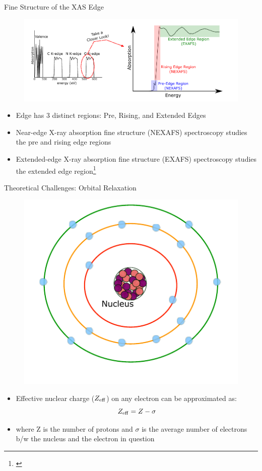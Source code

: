 \documentclass[t]{beamer}
\newcommand\footcite[1]{\footnote{\bibentry{#1}\label{\thepage:#1}}}
\begin{document}
\begin{frame}{Fine Structure of the XAS Edge}
\begin{figure}
\includegraphics[scale=0.7]{fine_structure.pdf}
\end{figure}
\begin{itemize}
\item Edge has 3 distinct regions: Pre, Rising, and Extended Edges
\item Near-edge X-ray absorption fine structure (NEXAFS) spectroscopy studies the pre and rising edge regions
\item Extended-edge X-ray absorption fine structure (EXAFS) spectroscopy studies the extended edge region\footcite{teo_exafs:_2012}
\end{itemize}
\end{frame}

\begin{frame}{Theoretical Challenges: Orbital Relaxation}
\begin{figure}[!t]
\includegraphics[scale=0.7]{core_hole_generation_1.pdf}
\end{figure}
\begin{itemize}
\item Effective nuclear charge ($Z_{\rm eff}$) on any electron can be approximated as:
\begin{equation}
Z_{\rm eff} = Z - \sigma
\end{equation}
\item where Z is the number of protons and $\sigma$ is the average number of electrons b/w the nucleus and the electron in question
\end{itemize}
\end{frame}
\end{document}

